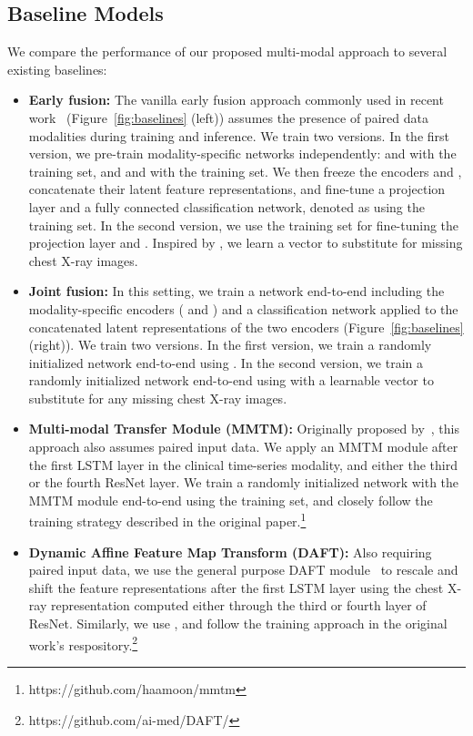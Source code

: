 \documentclass[pmlr]{jmlr}
\begin{document}
\subsection{Baseline Models}
We compare the performance of our proposed multi-modal approach to several existing baselines:
\vspace{-2mm}
\begin{itemize}\setlength\itemsep{-0.3em}
\item \textbf{Early fusion:} The vanilla early fusion approach commonly used in recent work~\citep{Huang2020_survey} (Figure~\ref{fig:baselines} (left)) assumes the presence of paired data modalities during training and inference. We train two versions. In the first version, we pre-train modality-specific networks independently:  and  with the  training set, and  and  with the  training set. We then freeze the encoders  and , concatenate their latent feature representations, and fine-tune a projection layer and a fully connected classification network, denoted as  using the  training set. In the second version, we use the  training set for fine-tuning the projection layer and . Inspired by \cite{kyono2021miracle}, we learn a vector to substitute for missing chest X-ray images.  

\item \textbf{Joint fusion:} In this setting, we train a network end-to-end including the modality-specific encoders ( and ) and a classification network applied to the concatenated latent representations of the two encoders (Figure~\ref{fig:baselines} (right)). We train two versions. In the first version, we train a randomly initialized network end-to-end using . In the second version, we train a randomly initialized network end-to-end using  with a learnable vector to substitute for any missing chest X-ray images. 

\item \textbf{Multi-modal Transfer Module (MMTM):} Originally proposed by~\cite{vaezi20mmtm}, this approach also assumes paired input data. We apply an MMTM module after the first LSTM layer in the clinical time-series modality, and either the third or the fourth ResNet layer. We train a randomly initialized network with the MMTM module end-to-end using the  training set, and closely follow the training strategy described in the original paper.\footnote{https://github.com/haamoon/mmtm} 

\item \textbf{Dynamic Affine Feature Map Transform (DAFT):} Also requiring paired input data, we use the general purpose DAFT module~\citep{daft} to rescale and shift the feature representations after the first LSTM layer using the chest X-ray representation computed either through the third or fourth layer of ResNet. Similarly, we use , and follow the training approach in the original work's respository.\footnote{https://github.com/ai-med/DAFT/} \end{itemize} 
\end{document}
